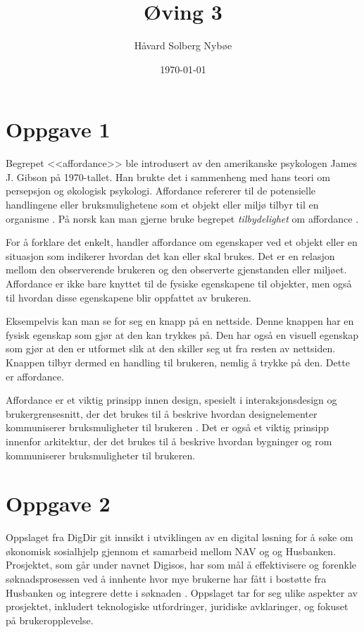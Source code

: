 \documentclass[a4paper, 12pt]{article}  %
\title{Øving 3}                         %
\author{Håvard Solberg Nybøe}           %
\date{\today}                           %
\begin{document}
\maketitle

\section*{Oppgave 1}
Begrepet <<affordance>> ble introdusert av den amerikanske psykologen James J. Gibson på 1970-tallet. 
Han brukte det i sammenheng med hans teori om persepsjon og økologisk psykologi. Affordance refererer til de potensielle handlingene eller bruksmulighetene som et objekt eller miljø tilbyr til en organisme \cite{volkoff2017}.
På norsk kan man gjerne bruke begrepet \emph{tilbydelighet} om affordance \cite{borgund2019}.

For å forklare det enkelt, handler affordance om egenskaper ved et objekt eller en situasjon som indikerer hvordan det kan eller skal brukes.
Det er en relasjon mellom den observerende brukeren og den observerte gjenstanden eller miljøet.
Affordance er ikke bare knyttet til de fysiske egenskapene til objekter, men også til hvordan disse egenskapene blir oppfattet av brukeren.

Eksempelvis kan man se for seg en knapp på en nettside.
Denne knappen har en fysisk egenskap som gjør at den kan trykkes på.
Den har også en visuell egenskap som gjør at den er utformet slik at den skiller seg ut fra resten av nettsiden. 
Knappen tilbyr dermed en handling til brukeren, nemlig å trykke på den.
Dette er affordance.

Affordance er et viktig prinsipp innen design, spesielt i interaksjonsdesign og brukergrensesnitt, der det brukes til å beskrive hvordan designelementer kommuniserer bruksmuligheter til brukeren \cite{volkoff2017}.
Det er også et viktig prinsipp innenfor arkitektur, der det brukes til å beskrive hvordan bygninger og rom kommuniserer bruksmuligheter til brukeren.


\section*{Oppgave 2}

Oppslaget fra DigDir git innsikt i utviklingen av en digital løsning for å søke om økonomisk sosialhjelp gjennom et samarbeid mellom NAV og og Husbanken.
Prosjektet, som går under navnet Digisos, har som mål å effektivisere og forenkle søknadsprosessen ved å innhente hvor mye brukerne har fått i bostøtte fra Husbanken og integrere dette i søknaden \cite{digisos}.
Oppslaget tar for seg ulike aspekter av prosjektet, inkludert teknologiske utfordringer, juridiske avklaringer, og fokuset på brukeropplevelse.
\end{document}
